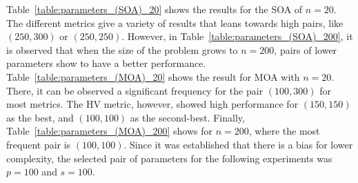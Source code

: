 Table~\ref{table:parameters_(SOA)_20} shows the results for the SOA of $n = 20$. The different metrics give a variety of results that leans towards high pairs, like $(250,300)$ or $(250,250)$. However, in Table~\ref{table:parameters_(SOA)_200}, it is observed that when the size of the problem grows to $n=200$, pairs of lower parameters show to have a better performance. \\

Table~\ref{table:parameters_(MOA)_20} shows the result for MOA with $n=20$. There, it can be observed a significant frequency for the pair $(100,300)$ for most metrics. The HV metric, however,  showed high performance for $(150,150)$ as the best, and $(100,100)$ as the second-best. Finally, Table~\ref{table:parameters_(MOA)_200} shows for $n=200$, where the most frequent pair is $(100,100)$.
%
Since it was established that there is a bias for lower complexity, the selected pair of parameters for the following experiments was $p=100$ and $s=100$.\\

\begin{table}[H]
\centering
{}
\caption{The results of the parameters experiment of $n=20$ for SOA, by combinations of a population size $p$ and a number of steps or generations $s$.}
\label{table:parameters_(SOA)_20}
\end{table}

